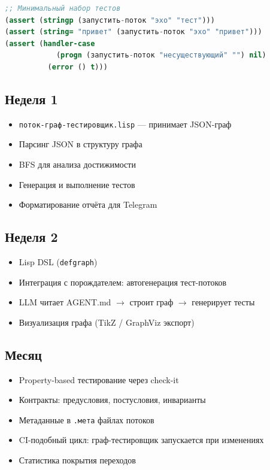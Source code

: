 \documentclass[12pt, a4paper, twoside]{article}
\begin{document}
\begin{lstlisting}[language=CommonLisp,caption={MVP: базовые тесты в тесты.lisp}]
;; Минимальный набор тестов
(assert (stringp (запустить-поток "эхо" "тест")))
(assert (string= "привет" (запустить-поток "эхо" "привет")))
(assert (handler-case
            (progn (запустить-поток "несуществующий" "") nil)
          (error () t)))
\end{lstlisting}

\subsection{Неделя 1}

\begin{itemize}[leftmargin=1.5em]
  \item \texttt{поток-граф-тестировщик.lisp} --- принимает JSON-граф
  \item Парсинг JSON в структуру графа
  \item BFS для анализа достижимости
  \item Генерация и выполнение тестов
  \item Форматирование отчёта для Telegram
\end{itemize}

\subsection{Неделя 2}

\begin{itemize}[leftmargin=1.5em]
  \item Lisp DSL (\texttt{defgraph})
  \item Интеграция с порождателем: автогенерация тест-потоков
  \item LLM читает AGENT.md $\to$ строит граф $\to$ генерирует тесты
  \item Визуализация графа (TikZ / GraphViz экспорт)
\end{itemize}

\subsection{Месяц}

\begin{itemize}[leftmargin=1.5em]
  \item Property-based тестирование через check-it
  \item Контракты: предусловия, постусловия, инварианты
  \item Метаданные в \texttt{.мета} файлах потоков
  \item CI-подобный цикл: граф-тестировщик запускается при изменениях
  \item Статистика покрытия переходов
\end{itemize}
\end{document}
